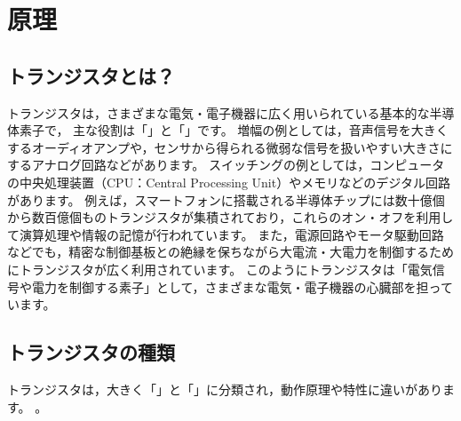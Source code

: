 \section{原理}

\subsection{トランジスタとは？}

トランジスタは，さまざまな電気・電子機器に広く用いられている基本的な半導体素子で，
主な役割は「」と「」です。
増幅の例としては，音声信号を大きくするオーディオアンプや，センサから得られる微弱な信号を扱いやすい大きさにするアナログ回路などがあります。
スイッチングの例としては，コンピュータの中央処理装置（CPU：Central Processing Unit）やメモリなどのデジタル回路があります。
例えば，スマートフォンに搭載される半導体チップには数十億個から数百億個ものトランジスタが集積されており，これらのオン・オフを利用して演算処理や情報の記憶が行われています。
また，電源回路やモータ駆動回路などでも，精密な制御基板との絶縁を保ちながら大電流・大電力を制御するためにトランジスタが広く利用されています。
このようにトランジスタは「電気信号や電力を制御する素子」として，さまざまな電気・電子機器の心臓部を担っています。

\subsection{トランジスタの種類}

トランジスタは，大きく「」と「」に分類され，動作原理や特性に違いがあります。
。

\vspace{5mm}

